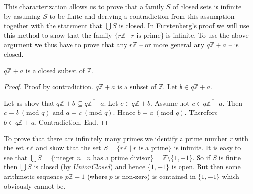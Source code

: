\documentclass{article}
\renewcommand{\mod}{\text{mod }}
\newcommand{\Int}{\mathbb{Z}}
\begin{document}
This characterization allows us to prove that a family $S$ of closed sets is infinite by assuming $S$ to be finite and deriving a contradiction from this assumption together with the statement that $\bigcup S$ is closed. In Fürstenberg's proof we will use this method to show that the family $\{ r \Int \mid r \text{ is prime} \}$ is infinite. To use the above argument we thus have to prove that any $r \Int$ -- or more general any $q \Int + a$ -- is closed.

  \begin{forthel}
    \begin{lemma}[ArSeqClosed]
      $q \Int + a$ is a closed subset of $\Int$.
    \end{lemma}
    \begin{proof}
      Proof by contradiction. $q \Int + a$ is a subset of $\Int$. Let $b \in \overline{q \Int + a}$.

      Let us show that $q \Int + b \subseteq \overline{q \Int + a}$.
        Let $c \in q \Int + b$. Assume not $c \in \overline{q \Int + a}$. Then $c = b ~(\mod q)$ and $a = c ~(\mod q)$. Hence $b = a ~(\mod q)$. Therefore $b \in q \Int + a$. Contradiction.
      End.
    \end{proof}
  \end{forthel}

  To prove that there are infinitely many primes we identify a prime number $r$ with the set $r \Int$ and show that the set $S = \{r \Int \mid r \textrm{ is a prime} \}$ is infinite. It is easy to see that $\bigcup S = \{ \text{integer } n \mid n \text{ has a prime divisor} \} = \Int \setminus \{ 1, -1 \}$. So if $S$ is finite then $\bigcup S$ is closed (by \textit{UnionClosed}) and hence $\{ 1, -1 \}$ is open. But then some arithmetic sequence $p \Int + 1$ (where $p$ is non-zero) is contained in $\{ 1, -1 \}$ which obviously cannot be.
\end{document}
